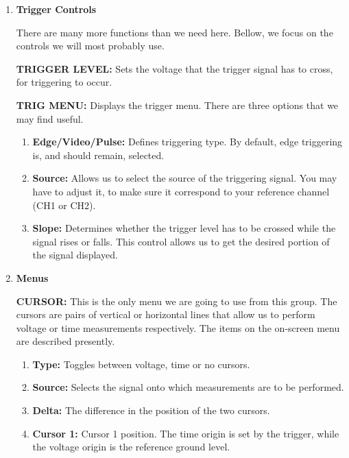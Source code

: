 \begin{enumerate}
\item {\bf Trigger Controls}

There are many more functions than we need here. Bellow, we focus on the controls
we will most probably use.

{\bf TRIGGER LEVEL:} Sets the voltage that the trigger signal has to cross, for
triggering to occur.

{\bf TRIG MENU:} Displays the trigger menu. There are three options that we may
find useful.

\begin{enumerate}

\item {\bf Edge/Video/Pulse:} Defines triggering type. By default, edge triggering
is, and should remain, selected.

\item {\bf Source:} Allows us to select the source of the triggering signal. You
may have to adjust it, to make sure it correspond to your reference channel
(CH1 or CH2).

\item {\bf Slope:} Determines whether the trigger level has to be crossed while
the signal rises or falls. This control allows us to get the desired portion of
the signal displayed.

\end{enumerate}

\item {\bf Menus}

{\bf CURSOR:} This is the only menu we are going to use from this group. The
cursors are pairs of vertical or horizontal lines that allow us to perform
voltage or time measurements respectively. The items on the on-screen menu
are described presently.

\begin{enumerate}

\item {\bf Type:} Toggles between voltage, time or no cursors.

\item {\bf Source:} Selects the signal onto which measurements are to be
performed.

\item {\bf Delta:} The difference in the position of the two cursors.

\item {\bf Cursor 1:} Cursor 1 position. The time origin is set by the
trigger, while the voltage origin is the reference ground level.


\end{enumerate}
\end{enumerate}
